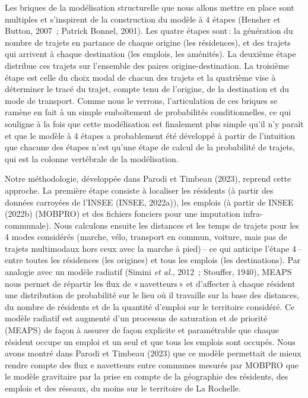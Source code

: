 \documentclass[
  9pt,
  a4paper,
  DIV=11]{scrreprt}
\begin{document}
Les briques de la modélisation structurelle que nous allons mettre en
place sont multiples et s'inspirent de la construction du modèle à 4
étapes (Hensher et Button, 2007~; Patrick Bonnel, 2001). Les quatre
étapes sont\,: la génération du nombre de trajets en partance de chaque
origine (les résidences), et des trajets qui arrivent à chaque
destination (les emplois, les aménités). La deuxième étape distribue ces
trajets sur l'ensemble des paires origine-destination. La troisième
étape est celle du choix modal de chacun des trajets et la quatrième
vise à déterminer le tracé du trajet, compte tenu de l'origine, de la
destination et du mode de transport. Comme nous le verrons,
l'articulation de ces briques se ramène en fait à un simple emboîtement
de probabilités conditionnelles, ce qui souligne à la fois que cette
modélisation est finalement plus simple qu'il n'y paraît et que le
modèle à 4 étapes a probablement été développé à partir de l'intuition
que chacune des étapes n'est qu'une étape de calcul de la probabilité de
trajets, qui est la colonne vertébrale de la modélisation.

Notre méthodologie, développée dans Parodi et Timbeau (2023), reprend
cette approche. La première étape consiste à localiser les résidents (à
partir des données carroyées de l'INSEE (INSEE, 2022a)), les emplois (à
partir de INSEE (2022b) (MOBPRO) et des fichiers fonciers pour une
imputation infra-communale). Nous calculons ensuite les distances et les
temps de trajets pour les 4 modes considérés (marche, vélo, transport en
commun, voiture, mais pas de trajets multimodaux hors ceux avec la
marche à pied)\,-- ce qui anticipe l'étape 4\,-- entre toutes les
résidences (les origines) et tous les emplois (les destinations). Par
analogie avec un modèle radiatif (Simini \emph{et al.}, 2012~; Stouffer,
1940), MEAPS nous permet de répartir les flux de «\,navetteurs\,» et
d'affecter à chaque résident une distribution de probabilité sur le lieu
où il travaille sur la base des distances, du nombre de résidents et de
la quantité d'emploi sur le territoire considéré. Ce modèle radiatif est
augmenté d'un processus de saturation et de priorité (MEAPS) de façon à
assurer de façon explicite et paramétrable que chaque résident occupe un
emploi et un seul et que tous les emplois sont occupés. Nous avons
montré dans Parodi et Timbeau (2023) que ce modèle permettait de mieux
rendre compte des flux e navetteurs entre communes mesurés par MOBPRO
que le modèle gravitaire par la prise en compte de la géographie des
résidents, des emplois et des réseaux, du moins sur le territoire de La
Rochelle.
\end{document}
